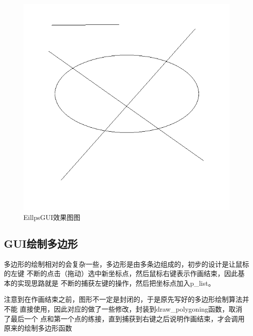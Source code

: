 \documentclass[a4paper,UTF8]{article}
\theoremstyle{definition}
\begin{document}
\begin{figure}[h]
	\centering
	\includegraphics[scale=0.3]{figure/EillpsGUI.png}
	\caption{EillpsGUI效果图图}
	\label{fig:EillpsGUI}
\end{figure}


\subsection{GUI绘制多边形}
多边形的绘制相对的会复杂一些，多边形是由多条边组成的，初步的设计是让鼠标的左键
不断的点击（拖动）选中新坐标点，然后鼠标右键表示作画结束，因此基本的实现思路就是
不断的捕获左键的操作，然后把坐标点加入p\_list。

注意到在作画结束之前，图形不一定是封闭的，于是原先写好的多边形绘制算法并不能
直接使用，因此对应的做了一些修改，封装到draw\_polygoning函数，取消了最后一个
点和第一个点的练接，直到捕获到右键之后说明作画结束，才会调用原来的绘制多边形函数
\end{document}
